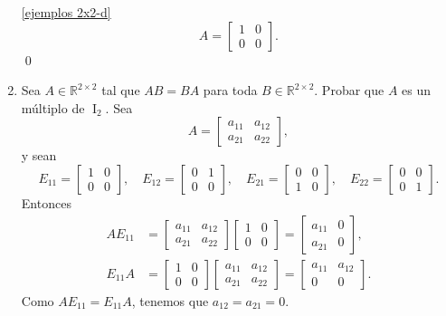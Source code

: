 \begin{enumerate}[topsep=6pt,itemsep=.4cm]
\ref{ejemplos 2x2-d}
\begin{equation*}
    A = \begin{bmatrix}
        1 & 0\\ 0 & 0
        \end{bmatrix}.
\end{equation*}
\qed


\item\label{2x2 central}  Sea $A \in\mathbb{R}^{2\times 2}$ tal que $AB=BA$ para toda $B\in\mathbb{R}^{2\times 2}$. Probar que $A$ es un múltiplo de $\operatorname{I}_2$.
\rta Sea
\begin{equation*}
    A = \begin{bmatrix} a_{11} & a_{12}\\ a_{21} & a_{22} \end{bmatrix},
\end{equation*}
y sean 
\begin{equation*}
    E_{11} = \begin{bmatrix} 1 & 0\\ 0 & 0\end{bmatrix},
    \quad
    E_{12} = \begin{bmatrix} 0 & 1\\ 0 & 0\end{bmatrix},
    \quad
    E_{21} = \begin{bmatrix} 0 & 0\\ 1 & 0\end{bmatrix},
    \quad
    E_{22} = \begin{bmatrix} 0 & 0\\ 0 & 1\end{bmatrix}. 
\end{equation*}
Entonces 
\begin{align*}
    AE_{11} &= \begin{bmatrix} a_{11} & a_{12}\\ a_{21} & a_{22} \end{bmatrix} \begin{bmatrix} 1 & 0\\ 0 & 0\end{bmatrix} =
    \begin{bmatrix} a_{11} &0\\ a_{21} & 0\end{bmatrix}, \\
    E_{11}A &=  \begin{bmatrix} 1 & 0\\ 0 & 0\end{bmatrix} \begin{bmatrix} a_{11} & a_{12}\\ a_{21} & a_{22} \end{bmatrix}=
    \begin{bmatrix} a_{11} & a_{12}\\ 0 & 0 \end{bmatrix}.
\end{align*}
Como $AE_{11} = E_{11}A$, tenemos que $a_{12} = a_{21} =0$.


\end{enumerate}
